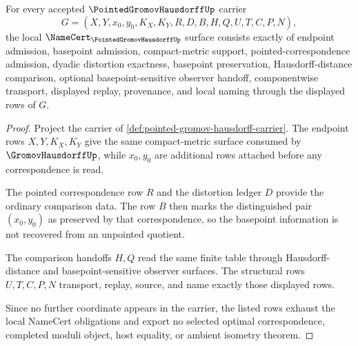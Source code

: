 \begin{theorem}
\label{thm:pointed-gromov-hausdorff-namecert-obligations}
For every accepted $\PointedGromovHausdorffUp$ carrier
$$
G=(X,Y,x_0,y_0,K_X,K_Y,R,D,B,H,Q,U,T,C,P,N),
$$
the local $\NameCert_{\PointedGromovHausdorffUp}$ surface consists exactly of endpoint admission, basepoint admission, compact-metric support, pointed-correspondence admission, dyadic distortion exactness, basepoint preservation, Hausdorff-distance comparison, optional basepoint-sensitive observer handoff, componentwise transport, displayed replay, provenance, and local naming through the displayed rows of $G$.
\end{theorem}
\begin{proof}
Project the carrier of \autoref{def:pointed-gromov-hausdorff-carrier}. The endpoint rows $X,Y,K_X,K_Y$ give the same compact-metric surface consumed by $\GromovHausdorffUp$, while $x_0,y_0$ are additional rows attached before any correspondence is read.

The pointed correspondence row $R$ and the distortion ledger $D$ provide the ordinary comparison data. The row $B$ then marks the distinguished pair $(x_0,y_0)$ as preserved by that correspondence, so the basepoint information is not recovered from an unpointed quotient.

The comparison handoffs $H,Q$ read the same finite table through Hausdorff-distance and basepoint-sensitive observer surfaces. The structural rows $U,T,C,P,N$ transport, replay, source, and name exactly those displayed rows.

Since no further coordinate appears in the carrier, the listed rows exhaust the local NameCert obligations and export no selected optimal correspondence, completed moduli object, host equality, or ambient isometry theorem.
\end{proof}

